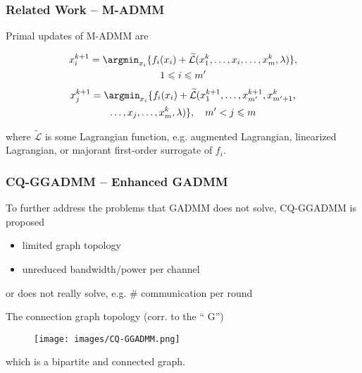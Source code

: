 \begin{frame}
\frametitle{Related Work -- M-ADMM}

Primal updates of M-ADMM are
\begin{fleqn}
\begin{multline*}
    x_i^{k+1} = \argmin_{x_i} \{ f_i(x_i) + \widetilde{\mathcal{L}}(x_1^{k},\ldots,x_i,\ldots,x_m^{k}, \lambda) \},\\
    1\leqslant i \leqslant m'
\end{multline*}
\begin{multline*}
    x_j^{k+1} = \argmin_{x_i} \{ f_i(x_i) + \widetilde{\mathcal{L}}(x_1^{k+1},\ldots,x_{m'}^{k+1},x_{m'+1}^{k},\\
    \ldots,x_j,\ldots,x_m^{k}, \lambda) \}, \quad m' < j \leqslant m
\end{multline*}
\end{fleqn}
where $\widetilde{\mathcal{L}}$ is some Lagrangian function, e.g. augmented Lagrangian, linearized Lagrangian, or {\color{red} majorant first-order surrogate} of $f_i$.

\end{frame}


\begin{frame}
\frametitle{CQ-GGADMM -- Enhanced GADMM}

To further address the problems that GADMM does not solve, {\color{red}CQ-G}GADMM \cite{issaid2020cq-ggadmm} is proposed

\begin{itemize}
    \item limited graph topology
    \item unreduced bandwidth/power per channel
\end{itemize}
or does not really solve, e.g. \# communication per round

\pause
\vspace{0.8em}

The connection graph topology (corr. to the ``{\color{red} G}'')
\begin{figure}[H]
    \centering
    \texttt{[image: images/CQ-GGADMM.png]}
\end{figure}
which is a {\color{red} bipartite} and connected graph.

\end{frame}


